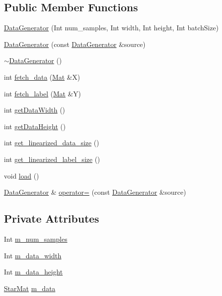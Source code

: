 \subsection*{Public Member Functions}
\begin{DoxyCompactItemize}
\item 
\hyperlink{classlbann_1_1DataGenerator_a66297bbed5baea4bba641e257166370c}{Data\+Generator} (Int num\+\_\+samples, Int width, Int height, Int batch\+Size)
\item 
\hyperlink{classlbann_1_1DataGenerator_a43972ae31aa6812519efe7f6e10ef467}{Data\+Generator} (const \hyperlink{classlbann_1_1DataGenerator}{Data\+Generator} \&source)
\item 
\hyperlink{classlbann_1_1DataGenerator_a3d524566c15637ca500b6a627904c719}{$\sim$\+Data\+Generator} ()
\item 
int \hyperlink{classlbann_1_1DataGenerator_a1465406c3e9766021dbd48b6b8c48590}{fetch\+\_\+data} (\hyperlink{base_8hpp_a68f11fdc31b62516cb310831bbe54d73}{Mat} \&X)
\item 
int \hyperlink{classlbann_1_1DataGenerator_a1749eb700820661f291c31d81f0118ba}{fetch\+\_\+label} (\hyperlink{base_8hpp_a68f11fdc31b62516cb310831bbe54d73}{Mat} \&Y)
\item 
int \hyperlink{classlbann_1_1DataGenerator_a9ba8ec1349a7a7f7248f56d3263ba62c}{get\+Data\+Width} ()
\item 
int \hyperlink{classlbann_1_1DataGenerator_ac85f1beaddb41e8d198e2986b7e2365e}{get\+Data\+Height} ()
\item 
int \hyperlink{classlbann_1_1DataGenerator_ad24923ec94dc5b6575b50b74adbefc28}{get\+\_\+linearized\+\_\+data\+\_\+size} ()
\item 
int \hyperlink{classlbann_1_1DataGenerator_a47c97d76cf83d53ef298f5ad5115e6cc}{get\+\_\+linearized\+\_\+label\+\_\+size} ()
\item 
void \hyperlink{classlbann_1_1DataGenerator_a8248cc6ea186c23147887ca83b1c4bd7}{load} ()
\item 
\hyperlink{classlbann_1_1DataGenerator}{Data\+Generator} \& \hyperlink{classlbann_1_1DataGenerator_a0feafc772df2e0923bea06d4d6065bc3}{operator=} (const \hyperlink{classlbann_1_1DataGenerator}{Data\+Generator} \&source)
\end{DoxyCompactItemize}
\subsection*{Private Attributes}
\begin{DoxyCompactItemize}
\item 
Int \hyperlink{classlbann_1_1DataGenerator_a679fdbd459ecefa053b64f78a166c020}{m\+\_\+num\+\_\+samples}
\item 
Int \hyperlink{classlbann_1_1DataGenerator_a054cb6ab0d93ec57419a81734ddf04aa}{m\+\_\+data\+\_\+width}
\item 
Int \hyperlink{classlbann_1_1DataGenerator_a676e679d18eb0523be714345205c662d}{m\+\_\+data\+\_\+height}
\item 
\hyperlink{base_8hpp_aba08580d21767b53d0737e115d738dbe}{Star\+Mat} \hyperlink{classlbann_1_1DataGenerator_a6e14ec2aa2b20ca3dbb72eddd1c5fad8}{m\+\_\+data}
\end{DoxyCompactItemize}


